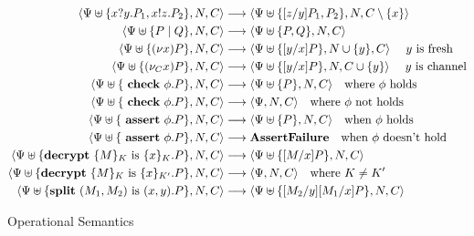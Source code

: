 \documentclass[master,english]{kuisthesis}
\theoremstyle{definition}
\begin{document}
\begin{figure}[h!]
\centering
\begin{align*}
\langle\Psi \uplus\{x?y.P_1, x!z.P_2\}, N, C\rangle &\longrightarrow \langle\Psi \uplus\{[z / y]P_1, P_2\}, N, C \setminus \{x\}\rangle \\
\langle\Psi \uplus\{P \mid Q\}, N, C\rangle &\longrightarrow\langle\Psi \uplus\{P, Q\}, N, C\rangle \\
\langle\Psi \uplus\{(\nu x) P\}, N, C\rangle &\longrightarrow\langle\Psi \uplus\{[y / x] P\}, N \cup \{y\}, C\rangle \quad \text{ $y$ is fresh}\\
\langle\Psi \uplus\{(\nu_C x) P\}, N, C\rangle &\longrightarrow\langle\Psi \uplus\{[y / x] P\}, N, C \cup \{y\}\rangle \quad \text{ $y$ is channel}\\
\langle\Psi \uplus\{\text { \textbf{check} } \phi . P\} , N, C\rangle &\longrightarrow \langle\Psi \uplus\{P\} , N, C\rangle \quad \text{where $\phi$ holds}\\
\langle\Psi \uplus\{\text { \textbf{check} } \phi . P\}, N, C\rangle &\longrightarrow \langle\Psi, N, C\rangle \quad \text{where $\phi$ not holds} \\
\langle\Psi \uplus\{\text { \textbf{assert} } \phi . P\} , N, C\rangle&\longrightarrow \langle\Psi \uplus\{P\}, N, C\rangle \quad \text{when $\phi$ holds} \\
\langle\Psi \uplus\{\text { \textbf{assert} } \phi . P\}, N, C\rangle &\longrightarrow \textbf{AssertFailure} \quad \text{when $\phi$ doesn't hold} \\ 
\langle\Psi \uplus\{ \text{\textbf{decrypt}}\ \{M\}_K
\text{ is } \{x\}_K . P\} , N, C\rangle &\longrightarrow\langle\Psi \uplus\{[M / x] P\} , N, C \rangle\\
\langle\Psi \uplus\{ \text{\textbf{decrypt}}\ \{M\}_K
\text{ is } \{x\}_{K'} . P\} , N, C\rangle &\longrightarrow\langle\Psi, N, C\rangle \quad \text{where $K \not= K'$} \\
\langle\Psi \uplus\{ \text{\textbf{split}}\ (M_1, M_2)
\text{ is } (x, y) . P\}, N, C\rangle &\longrightarrow\langle\Psi \uplus\{[M_2 / y][M_1 / x] P\}, N, C \rangle\\
\end{align*}
    \caption{Operational Semantics}
    \label{fig:semantics}
\end{figure}
\end{document}
